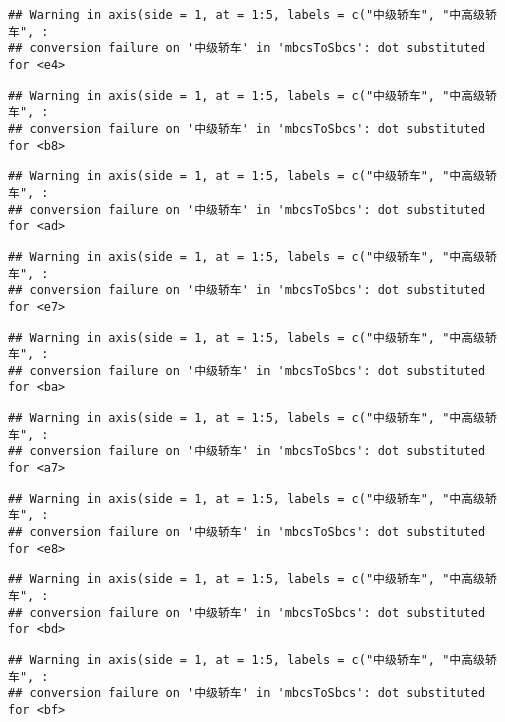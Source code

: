 \documentclass[]{article}
\begin{document}
\begin{verbatim}
## Warning in axis(side = 1, at = 1:5, labels = c("中级轿车", "中高级轿车", :
## conversion failure on '中级轿车' in 'mbcsToSbcs': dot substituted for <e4>
\end{verbatim}

\begin{verbatim}
## Warning in axis(side = 1, at = 1:5, labels = c("中级轿车", "中高级轿车", :
## conversion failure on '中级轿车' in 'mbcsToSbcs': dot substituted for <b8>
\end{verbatim}

\begin{verbatim}
## Warning in axis(side = 1, at = 1:5, labels = c("中级轿车", "中高级轿车", :
## conversion failure on '中级轿车' in 'mbcsToSbcs': dot substituted for <ad>
\end{verbatim}

\begin{verbatim}
## Warning in axis(side = 1, at = 1:5, labels = c("中级轿车", "中高级轿车", :
## conversion failure on '中级轿车' in 'mbcsToSbcs': dot substituted for <e7>
\end{verbatim}

\begin{verbatim}
## Warning in axis(side = 1, at = 1:5, labels = c("中级轿车", "中高级轿车", :
## conversion failure on '中级轿车' in 'mbcsToSbcs': dot substituted for <ba>
\end{verbatim}

\begin{verbatim}
## Warning in axis(side = 1, at = 1:5, labels = c("中级轿车", "中高级轿车", :
## conversion failure on '中级轿车' in 'mbcsToSbcs': dot substituted for <a7>
\end{verbatim}

\begin{verbatim}
## Warning in axis(side = 1, at = 1:5, labels = c("中级轿车", "中高级轿车", :
## conversion failure on '中级轿车' in 'mbcsToSbcs': dot substituted for <e8>
\end{verbatim}

\begin{verbatim}
## Warning in axis(side = 1, at = 1:5, labels = c("中级轿车", "中高级轿车", :
## conversion failure on '中级轿车' in 'mbcsToSbcs': dot substituted for <bd>
\end{verbatim}

\begin{verbatim}
## Warning in axis(side = 1, at = 1:5, labels = c("中级轿车", "中高级轿车", :
## conversion failure on '中级轿车' in 'mbcsToSbcs': dot substituted for <bf>
\end{verbatim}
\end{document}
